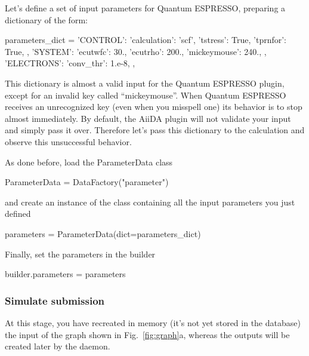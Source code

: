 Let's define a set of input parameters for Quantum ESPRESSO, preparing a dictionary of the form:
\begin{pythoncommand}
parameters_dict = {
    'CONTROL': {
        'calculation': 'scf',
        'tstress': True,
        'tprnfor': True,
    },
    'SYSTEM': {
        'ecutwfc': 30.,
        'ecutrho': 200.,
        'mickeymouse': 240.,
    },
    'ELECTRONS': {
        'conv_thr': 1.e-8,
    },
}
\end{pythoncommand}
This dictionary is almost a valid input for the Quantum ESPRESSO plugin, except for an invalid key called ``mickeymouse''.
When Quantum ESPRESSO receives an unrecognized key (even when you misspell one) its behavior is to stop almost immediately.
By default, the AiiDA plugin will not validate your input and simply pass it over.
Therefore let's pass this dictionary to the calculation and observe this unsuccessful behavior.

As done before, load the ParameterData class
\begin{pythoncommand}
 ParameterData = DataFactory("parameter") 
\end{pythoncommand}
and create an instance of the class containing all the input parameters you just defined
\begin{pythoncommand}
 parameters = ParameterData(dict=parameters_dict)
\end{pythoncommand}
Finally, set the parameters in the builder
\begin{pythoncommand}
 builder.parameters = parameters
\end{pythoncommand}






\subsubsection{Simulate submission}
At this stage, you have recreated in memory (it's not yet stored in the database) the input of the graph shown in Fig.~\ref{fig:graph}a, whereas the outputs will be created later by the daemon.

